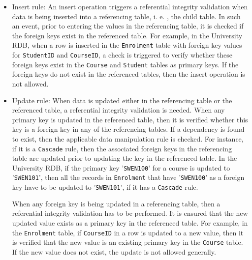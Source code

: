\begin{itemize}
  \item Insert rule: An insert operation triggers a referential integrity
validation when data is being inserted into a referencing table,   i. e. ,   the
child table.  In such an event,   prior to entering the values in the referencing
table,   it is checked if the foreign keys exist in the referenced table.  For
example,   in the University \ac{RDB},   when a row is inserted in the
\texttt{Enrolment} table with foreign key values for \texttt{StudentID} and
\texttt{CourseID},   a check is triggered to verify whether these foreign keys
exist in the \texttt{Course} and \texttt{Student} tables as primary keys.  If
the foreign keys do not exist in the referenced tables,   then the insert operation is not allowed. 

\item Update rule: When data is updated either in the referencing table or
the referenced table,   a referential integrity validation is needed.  When any
primary key is updated in the referenced table,  
then it is verified whether this key is a foreign key in any of the
referencing tables.  If a dependency is found to exist,   then the applicable
data manipulation rule is checked.  For instance,   if it is a \texttt{Cascade}
rule,   then the associated foreign keys in the referencing table are updated
prior to updating the key in the referenced table.  In the University \ac{RDB},  
if the primary key '\texttt{SWEN100}' for a course is updated to
'\texttt{SWEN101}',   then all the records in \texttt{Enrolment} that have
'\texttt{SWEN100}' as a foreign key have to be updated to '\texttt{SWEN101}',  
if it has a \texttt{Cascade} rule. 

When any foreign key is being updated in a referencing table,   then a referential
integrity validation has to be performed.  It is ensured that the new
updated value exists as a primary key in the referenced table.  For example,   in
the \texttt{Enrolment} table,   if \texttt{CourseID} in a row is updated to a new
value,   then it is verified that the new value is an existing primary key in the
\texttt{Course} table.  If the new value does not exist,   the
update is not allowed generally. 


\end{itemize}
